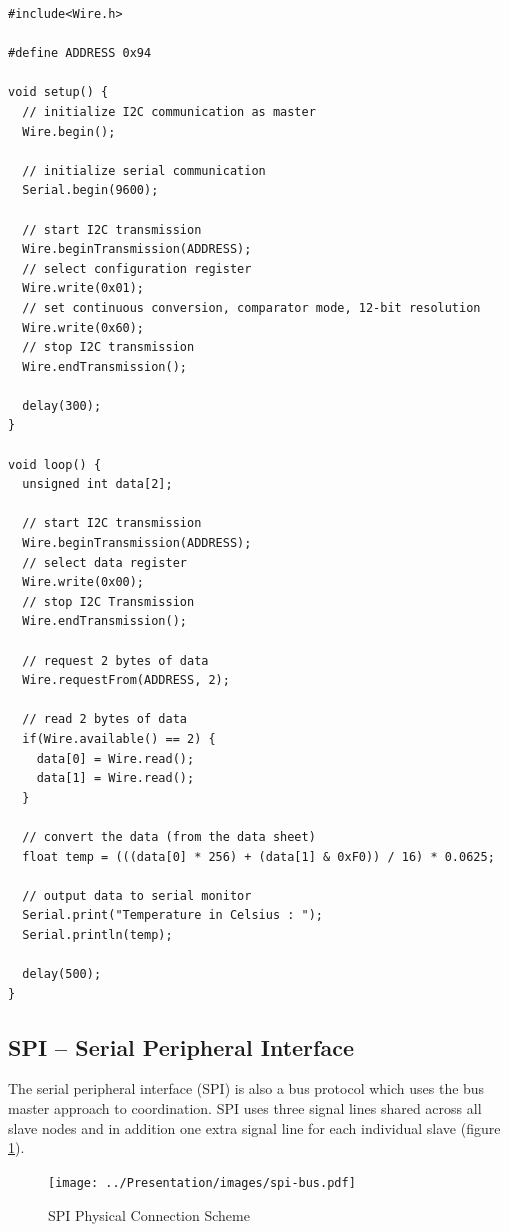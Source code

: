 \documentclass[pdftex,12pt,a4paper,fleqn]{scrartcl}
\begin{document}
\begin{verbatim}
#include<Wire.h>

#define ADDRESS 0x94

void setup() {
  // initialize I2C communication as master
  Wire.begin();
        
  // initialize serial communication
  Serial.begin(9600);

  // start I2C transmission
  Wire.beginTransmission(ADDRESS);
  // select configuration register
  Wire.write(0x01);
  // set continuous conversion, comparator mode, 12-bit resolution
  Wire.write(0x60);
  // stop I2C transmission
  Wire.endTransmission();
        
  delay(300);  
}

void loop() {
  unsigned int data[2];
        
  // start I2C transmission
  Wire.beginTransmission(ADDRESS);
  // select data register
  Wire.write(0x00);
  // stop I2C Transmission
  Wire.endTransmission();

  // request 2 bytes of data
  Wire.requestFrom(ADDRESS, 2);

  // read 2 bytes of data
  if(Wire.available() == 2) {
    data[0] = Wire.read();
    data[1] = Wire.read();
  }
          
  // convert the data (from the data sheet)
  float temp = (((data[0] * 256) + (data[1] & 0xF0)) / 16) * 0.0625;
        
  // output data to serial monitor
  Serial.print("Temperature in Celsius : ");
  Serial.println(temp);
       
  delay(500);
}
\end{verbatim}
\parskip 6pt

\subsection{SPI -- Serial Peripheral Interface}
The serial peripheral interface (SPI) is also a bus protocol which uses the bus master approach to coordination. SPI uses three signal lines shared across all slave nodes and in addition one extra signal line for each individual slave (figure \ref{fig:spi_physical}).

\begin{figure}[h]	
  \centering
  \texttt{[image: ../Presentation/images/spi-bus.pdf]}
  \caption{SPI Physical Connection Scheme}
  \label{fig:spi_physical}
\end{figure}
\end{document}

